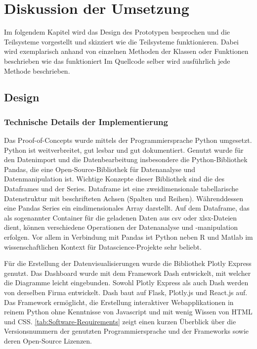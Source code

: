 \chapter{Diskussion der Umsetzung}
\label{chap:five}
Im folgendem Kapitel wird das Design des Prototypen besprochen und die Teilsysteme vorgestellt und skizziert wie die Teilsysteme
funktionieren. Dabei wird exemplarisch anhand von einzelnen Methoden der Klassen oder Funktionen beschrieben wie das funktioniert
Im Quellcode selber wird ausführlich jede Methode beschrieben.
\section{Design}
    \subsection{Technische Details der Implementierung}
    Das Proof-of-Concepts wurde mittels der Programmiersprache Python umgesetzt. 
    Python ist weitverbreitet, gut lesbar und gut dokumentiert. Genutzt wurde für den Datenimport und die Datenbearbeitung insbesondere die Python-Bibliothek 
    Pandas, die eine Open-Source-Bibliothek für Datenanalyse und Datenmanipulation ist. Wichtige Konzepte dieser Bibliothek sind die des Dataframes und der Series. 
    Dataframe ist eine zweidimensionale tabellarische Datenstruktur mit beschrifteten Achsen (Spalten und Reihen).
    Währenddessen eine Pandas Series ein eindimensionales Array darstellt. Auf dem Dataframe, das als sogenannter Container für
    die geladenen Daten aus csv oder xlsx-Dateien dient, können verschiedene Operationen der Datenanalyse und -manipulation erfolgen.
    Vor allem in Verbindung mit Pandas ist Python neben R und Matlab im wissenschaftlichen Kontext für Datascience-Projekte sehr beliebt.

    
    Für die Erstellung der Datenvisualisierungen wurde die Bibliothek Plotly Express genutzt. 
    Das Dashboard wurde mit dem Framework Dash entwickelt, mit welcher die Diagramme leicht eingebunden. 
    Sowohl Plotly Express als auch Dash werden von derselben Firma entwickelt. Dash baut
    auf Flask, Plotly.js und React.js auf. Das Framework ermöglicht, die Erstellung interaktiver Webapplikationen 
    in reinem Python ohne Kenntnisse von Javascript und mit wenig Wissen von HTML und CSS. \autoref{tab:Software-Requirements} zeigt einen 
    kurzen Überblick über die Versionsnummern der genutzten Programmiersprache und der Frameworks sowie deren Open-Source
    Lizenzen.
    
